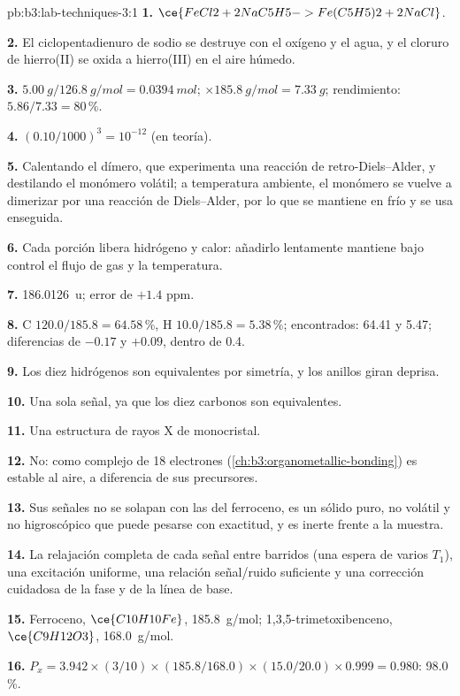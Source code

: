 \begin{solution}{pb:b3:lab-techniques-3:1}
\textbf{1.} $\ce{FeCl2 + 2NaC5H5 -> Fe(C5H5)2 + 2NaCl}$.

\textbf{2.} El ciclopentadienuro de sodio se destruye con el oxígeno y el agua, y el cloruro de hierro(II)
se oxida a hierro(III) en el aire húmedo.

\textbf{3.} $\qty{5.00}{g}/\qty{126.8}{g/mol} = \qty{0.0394}{mol}$; $\times \qty{185.8}{g/mol} = \qty{7.33}{g}$; rendimiento: $5.86/7.33 = 80$\,\%.

\textbf{4.} $(0.10/1000)^3 = 10^{-12}$ (en teoría).

\textbf{5.} Calentando el dímero, que experimenta una reacción de retro-Diels--Alder, y
destilando el monómero volátil; a temperatura ambiente, el monómero se vuelve a dimerizar
por una reacción de Diels--Alder, por lo que se mantiene en frío y se usa enseguida.

\textbf{6.} Cada porción libera hidrógeno y calor: añadirlo lentamente mantiene bajo control el flujo de gas
y la temperatura.

\textbf{7.} \qty{186.0126}{u}; error de $+1.4$ ppm.

\textbf{8.} C $120.0/185.8 = 64.58$\,\%, H $10.0/185.8 = 5.38$\,\%; encontrados: 64.41 y 5.47; diferencias de $-0.17$ y $+0.09$, dentro de 0.4.

\textbf{9.} Los diez hidrógenos son equivalentes por simetría, y los anillos giran deprisa.

\textbf{10.} Una sola señal, ya que los diez carbonos son equivalentes.

\textbf{11.} Una estructura de rayos X de monocristal.

\textbf{12.} No: como complejo de 18 electrones (\cref{ch:b3:organometallic-bonding}) es estable al aire, a diferencia de sus
precursores.

\textbf{13.} Sus señales no se solapan con las del ferroceno, es un sólido puro, no volátil y
no higroscópico que puede pesarse con exactitud, y es inerte frente a la
muestra.

\textbf{14.} La relajación completa de cada señal entre barridos (una espera de varios $T_1$),
una excitación uniforme, una relación señal/ruido suficiente y una corrección cuidadosa de la fase y de la línea
de base.

\textbf{15.} Ferroceno, $\ce{C10H10Fe}$, \qty{185.8}{g/mol}; 1,3,5-trimetoxibenceno, $\ce{C9H12O3}$, \qty{168.0}{g/mol}.

\textbf{16.} $P_x = 3.942 \times (3/10) \times (185.8/168.0) \times (15.0/20.0) \times 0.999 = 0.980$: 98.0\,\%.


\end{solution}
